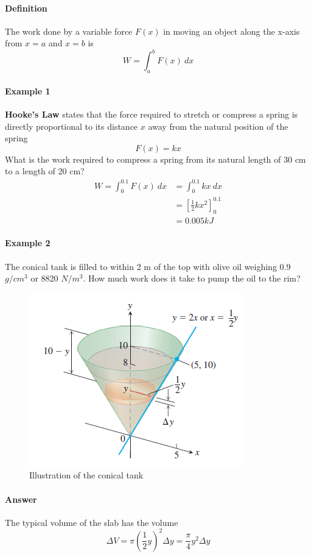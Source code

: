 \documentclass[12pt]{article}
\begin{document}
\paragraph{Definition}
The work done by a variable force $F(x)$ in moving an object along the x-axis from $x = a$ and $x = b$ is 
\[
    W = \int_a^b F(x)\: dx
\]

\paragraph{Example 1} 
\textbf{Hooke's Law} states that the force required to stretch or compress a spring is directly proportional to its distance
$x$ away from the natural position of the spring
\[
    F(x) = k x
\]
What is the work required to compress a spring from its natural length of 30 cm to a length of 20 cm?
\begin{align*} 
     W = \int_0^0.1 F(x)\: dx &= \int_0^0.1 kx\: dx \\
     &= \left[ \frac{1}{2} k x^2\right]_0^0.1 \\
     &= 0.005 k J
\end{align*}

\paragraph{Example 2}
The conical tank is filled to within 2 m of the top with olive oil weighing 0.9 $g/cm^3$ or 8820 $N/m^3$. How much work does it take to pump the oil to the rim?
\begin{figure}[H]
     \centering
     \includegraphics[width = 0.4\linewidth]{Images/work example.png}
     \caption{Illustration of the conical tank}
\end{figure}

\paragraph{Answer}
The typical volume of the slab has the volume
\[
    \Delta V = \pi \left(\frac{1}{2} y \right)^2 \Delta y = \frac{\pi}{4} y^2 \Delta y
\]
\end{document}
